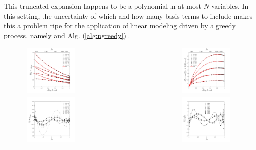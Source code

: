 \documentclass[twocolumn,aps,prd,floatfix,preprintnumbers,a4paper,nofootinbib,
superscriptaddress,10pt]{revtex4-1}
\begin{document}
%
%
\par This truncated expansion happens to be a polynomial in at most $N$ variables.
%
In this setting, the uncertainty of which and how many basis terms to include makes this a problem ripe for the application of linear modeling driven by a greedy process, namely  and Alg. (\ref{alg:pgreedy}) .
%
%
\begin{figure}[htb]
  \begin{tabular}{lr}
    \includegraphics[width=0.49\textwidth]{fig/fits_w.pdf} & \includegraphics[width=0.49\textwidth]{fig/fits_tau.pdf}
    \\
    \includegraphics[width=0.49\textwidth]{fig/res_w.pdf} & \includegraphics[width=0.49\textwidth]{fig/res_tau.pdf}

\end{tabular}
\end{figure}
\end{document}
